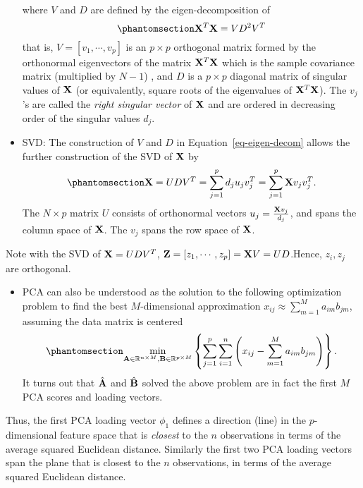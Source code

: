 \documentclass[
  letterpaper,
  DIV=11,
  numbers=noendperiod]{scrreprt}
\providecommand{\tightlist}{%
  \setlength{\itemsep}{0pt}\setlength{\parskip}{0pt}}\usepackage{longtable,booktabs,array}
\begin{document}
\begin{itemize}
\[  \] where \(V\) and \(D\) are defined by the eigen-decomposition of
  \begin{equation}\phantomsection\label{eq-eigen-decom}{
  {\bf X}^T{\bf X}=VD^2V^T
  }\end{equation} that is, \(V=[v_1, \cdots, v_p]\) is an \(p\times p\)
  orthogonal matrix formed by the orthonormal eigenvectors of the matrix
  \({\bf X}^T{\bf X}\) which is the sample covariance matrix (multiplied
  by \(N-1\)) , and \(D\) is a \(p\times p\) diagonal matrix of singular
  values of \({\bf X}\) (or equivalently, square roots of the
  eigenvalues of \({\bf X}^T{\bf X}\)). The \(v_j\)'s are called the
  \emph{right singular vector} of \({\bf X}\) and are ordered in
  decreasing order of the singular values \(d_j\).
\item
  SVD: The construction of \(V\) and \(D\) in
  Equation~\ref{eq-eigen-decom} allows the further construction of the
  SVD of \({\bf X}\) by
  \begin{equation}\phantomsection\label{eq-svd}{{\bf X}=UDV^T =\sum_{j=1}^p d_ju_jv_j^T = \sum_{j=1}^p {\bf X}v_jv_j^T. }\end{equation}
  The \(N\times p\) matrix \(U\) consists of orthonormal vectors
  \(u_j=\frac{{\bf X}v_j}{d_j}\), and spans the column space of
  \({\bf X}\). The \(v_j\) spans the row space of \({\bf X}\).
\end{itemize}

Note with the SVD of \({\bf X}=UDV^T\),
\({\bf Z}= [z_1, \cdots, z_p]={\bf X}V=UD\).Hence, \(z_i, z_j\) are
orthogonal.

\begin{itemize}
\tightlist
\item
  PCA can also be understood as the solution to the following
  optimization problem to find the best \(M\)-dimensional approximation
  \(x_{ij}\approx \sum_{m=1}^M a_{im} b_{jm}\), assuming the data matrix
  is centered \begin{equation}\phantomsection\label{eq-pca-approx}{
  \min_{{\bf A}\in \mathbb{R}^{n\times M}, {\bf B}\in \mathbb{R}^{p\times M}} \left\{ \sum_{j=1}^p\sum_{i=1}^n \left(x_{ij} - \sum_{m=1}^M a_{im} b_{jm}   \right) \right\}.
  }\end{equation} It turns out that \(\hat{\bf A}\) and \(\hat{\bf B}\)
  solved the above problem are in fact the first \(M\) PCA scores and
  loading vectors.
\end{itemize}

Thus, the first PCA loading vector \(\phi_1\) defines a direction (line)
in the \(p\)-dimensional feature space that is \emph{closest} to the
\(n\) observations in terms of the average squared Euclidean distance.
Similarly the first two PCA loading vectors span the plane that is
closest to the \(n\) observations, in terms of the average squared
Euclidean distance.
\end{document}
